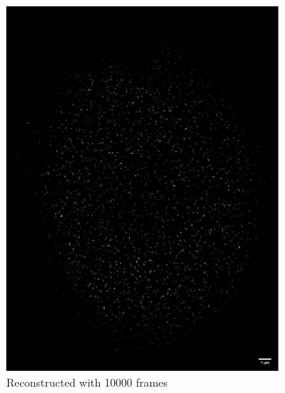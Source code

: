 \documentclass[a4paper,english,12pt,bibliography=totoc]{scrreprt}
\begin{document}
\begin{figure}[hbpt]
\begin{subfigure}[b]{0.45\textwidth}
        \includegraphics[width=\textwidth]{Images/STORM/10000frames.png}
        \caption{Reconstructed with 10000 frames}
        \label{fig:image2}
    \end{subfigure}
    \vfill
    \begin{subfigure}[b]{0.45\textwidth}
        \centering

\end{subfigure}
\end{figure}
\end{document}
